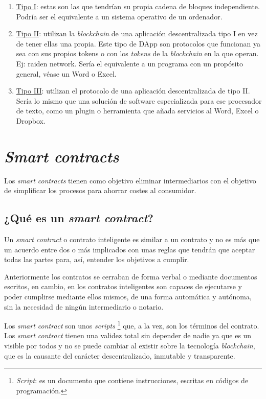 \begin{enumerate}
	\item \underline{Tipo I}: estas son las que tendrían su propia cadena de bloques independiente. Podría ser el equivalente a un sistema operativo de un ordenador.
	\item \underline{Tipo II}: utilizan la \textit{blockchain} de una aplicación descentralizada tipo I en vez de tener ellas una propia. Este tipo de DApp son protocolos que funcionan ya sea con sus propios tokens o con los \textit{tokens} de la \textit{blockchain} en la que operan. Ej: raiden network. Sería el equivalente a un programa con un propósito general, véase un Word o Excel.
	\item \underline{Tipo III}: utilizan el protocolo de una aplicación descentralizada de tipo II. Sería lo mismo que una solución de software especializada para ese procesador de texto, como un plugin o herramienta que añada servicios al Word, Excel o Dropbox. 
\end{enumerate}

\section{\textit{Smart contracts}}

Los \textit{smart contracts} tienen como objetivo eliminar intermediarios con el objetivo de simplificar los procesos para ahorrar costes al consumidor.

\subsection{¿Qué es un \textit{smart contract}?}

Un \textit{smart contract}\cite{smartContract}\cite{smartContract1} o contrato inteligente es similar a un contrato y no es más que un acuerdo entre dos o más implicados con unas reglas que tendrán que aceptar todas las partes para, así, entender los objetivos a cumplir. 

Anteriormente los contratos se cerraban de forma verbal o mediante documentos escritos, en cambio, en los contratos inteligentes son capaces de ejecutarse y poder cumplirse mediante ellos mismos, de una forma automática y autónoma, sin la necesidad de ningún intermediario o notario. 

Los \textit{smart contract} son unos \textit{scripts} \footnote{\textit{Script}: es un documento que contiene instrucciones, escritas en códigos de programación.} que, a la vez, son los términos del contrato. Los \textit{smart contract} tienen una validez total sin depender de nadie ya que es un visible por todos y no se puede cambiar al existir sobre la tecnología \textit{blockchain}, que es la causante del carácter descentralizado, inmutable y transparente.

